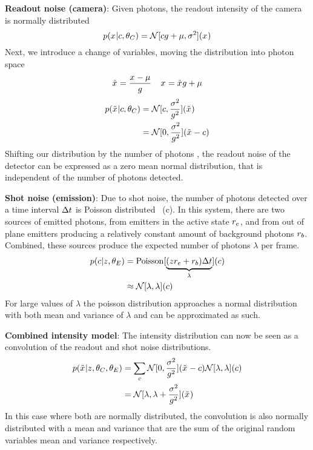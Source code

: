 \textbf{Readout noise (camera)}:
  Given \photons photons, the readout intensity of the camera is normally distributed~\citep{huang_video-rate_2013}
  \begin{equation}
    p(x_{}|c,\theta_C) = \mathcal{N}[cg + \mu, \sigma^2](x_{})
  \end{equation}
  Next, we introduce a change of variables, moving the distribution into photon space
  \begin{equation}
    \tilde{x}_{} = \frac{x_{} - \mu}{g}
    \;\;\;\;
    x_{} = \tilde{x}_{}g + \mu
  \end{equation}
  \begin{align}
    p(\tilde{x}_{}|c,\theta_C)
      &= \mathcal{N}[c, \frac{\sigma^2}{g^2}](\tilde{x}_{}) \\
      &= \mathcal{N}[0, \frac{\sigma^2}{g^2}](\tilde{x}_{} - c)
  \end{align}
  Shifting our distribution by the number of photons \photons, the readout noise of the detector can be expressed as a zero mean 
  normal distribution, that is independent of the number of photons detected.


\textbf{Shot noise (emission)}:
  Due to shot noise, the number of photons detected over a time interval $\Delta t$ is Poisson
  distributed~\cite{mehta_poisson_2016} (c). 
  In this system, there are two sources of emitted photons, from emitters in the active state $r_e$,
  and from out of plane emitters producing a relatively constant amount of background photons $r_b$. Combined, 
  these sources produce the expected number of photons $\lambda$ per frame.
  \begin{align}
    p(c|z_{},\theta_E)
      &= \operatorname{Poisson}[\underbrace{(z_{}r_e + r_b)\Delta t}_{\lambda}](c) \\
      &\approx \mathcal{N}[\lambda, \lambda](c)
  \end{align}
  For large values of $\lambda$ the poisson distribution approaches a normal distribution with both mean and 
  variance of $\lambda$ and can be approximated as such.

\textbf{Combined intensity model}:
The intensity distribution can now be seen as a convolution of the readout and shot noise distributions.
  \begin{align}
    p(\tilde{x}_{}|z_{},\theta_C, \theta_E)
      &= \sum_c
        \mathcal{N}[0, \frac{\sigma^2}{g^2}](\tilde{x}_{} - c)
        \mathcal{N}[\lambda, \lambda](c) \\
      &= \mathcal{N}[\lambda, \lambda + \frac{\sigma^2}{g^2}](\tilde{x}_{})
      \label{eq:method:approx_nomral}
  \end{align}
  In this case where both are normally distributed, the convolution is also normally distributed with 
  a mean and variance that are the sum of the original random variables mean and variance respectively. 

